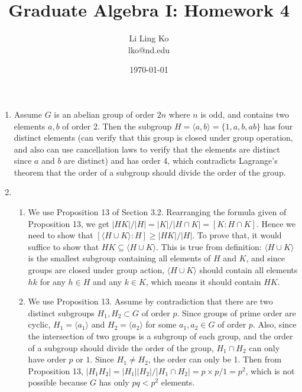 \documentclass{article}
\begin{document}
\title{Graduate Algebra I: Homework 4}
\author{Li Ling Ko\\ lko@nd.edu}
\date{\today}
\maketitle

\begin{enumerate}
  \item Assume $G$ is an abelian group of order $2n$ where $n$ is odd, and
    contains two elements $a,b$ of order 2. Then the subgroup $H=\langle
    a,b\rangle=\{1,a,b,ab\}$ has four distinct elements (can verify that
    this group is closed under group operation, and also can use
    cancellation laws to verify that the elements are distinct since $a$
    and $b$ are distinct) and has order 4, which contradicts Lagrange's
    theorem that the order of a subgroup should divide the order of the
    group.

  \item
    \begin{enumerate}
      \item We use Proposition 13 of Section 3.2. Rearranging the formula
        given of Proposition 13, we get $|HK|/|H|=|K|/|H\cap K|=[K:H\cap
        K]$. Hence we need to show that $[\langle H\cup K\rangle:H]\geq
        |HK|/|H|$. To prove that, it would suffice to show that
        $HK\subseteq\langle H\cup K\rangle$. This is true from definition:
        $\langle H\cup K\rangle$ is the smallest subgroup containing all
        elements of $H$ and $K$, and since groups are closed under group
        action, $\langle H\cup K\rangle$ should contain all elements $hk$
        for any $h\in H$ and any $k\in K$, which means it should contain
        $HK$.

      \item We use Proposition 13. Assume by contradiction that there are
        two distinct subgroups $H_1,H_2\subset G$ of order $p$. Since
        groups of prime order are cyclic, $H_1=\langle a_1\rangle$ and
        $H_2=\langle a_2\rangle$ for some $a_1,a_2\in G$ of order $p$.
        Also, since the intersection of two groups is a subgroup of each
        group, and the order of a subgroup should divide the order of the
        group, $H_1\cap H_2$ can only have order $p$ or $1$. Since $H_1\neq
        H_2$, the order can only be 1. Then from Proposition 13,
        $|H_1H_2|=|H_1||H_2|/|H_1\cap H_2|=p\times p/1=p^2$, which is not
        possible because $G$ has only $pq<p^2$ elements.
    \end{enumerate}


\end{enumerate}
\end{document}
